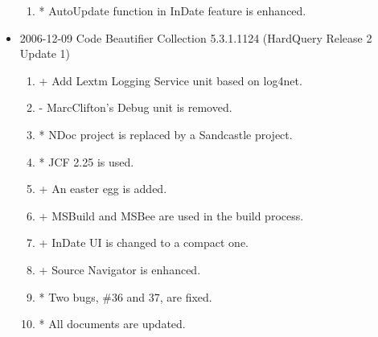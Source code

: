 \begin{itemize}
\begin{enumerate}
  \item * AutoUpdate function in InDate feature is enhanced.
\end{enumerate}
  \item 2006-12-09 Code Beautifier Collection 5.3.1.1124 (HardQuery Release 2
  Update 1)
    \begin{enumerate}
      \item + Add Lextm Logging Service unit based on log4net.
      \item - MarcClifton's Debug unit is removed.
      \item * NDoc project is replaced by a Sandcastle project.
      \item * JCF 2.25 is used.
      \item + An easter egg is added.
      \item + MSBuild and MSBee are used in the build process.
      \item + InDate UI is changed to a compact one.
      \item + Source Navigator is enhanced.
      \item * Two bugs, \#36 and 37, are fixed.
      \item * All documents are updated.
    \end{enumerate}


\end{itemize}

